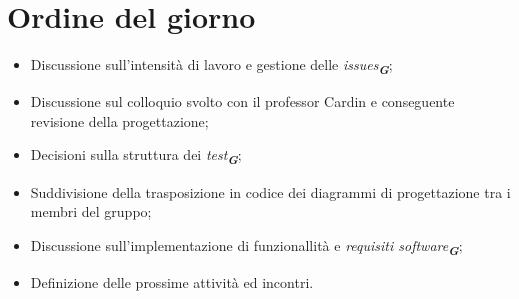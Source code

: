 

\section{Ordine del giorno}

\begin{itemize}
    \item Discussione sull'intensità di lavoro e gestione delle \emph{issues}\textsubscript{\textit{\textbf{G}}};
    \item Discussione sul colloquio svolto con il professor Cardin e conseguente revisione della progettazione;
    \item Decisioni sulla struttura dei \emph{test}\textsubscript{\textit{\textbf{G}}};
    \item Suddivisione della trasposizione in codice dei diagrammi di progettazione tra i membri del gruppo;
    \item Discussione sull'implementazione di funzionallità e \emph{requisiti software}\textsubscript{\textit{\textbf{G}}};
    \item Definizione delle prossime attività ed incontri.
\end{itemize}